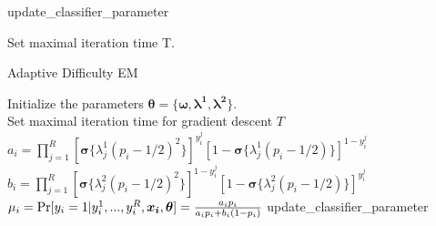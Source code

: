 \documentclass{article}
\begin{document}
\begin{algorithm}
    \caption{update\_classifier\_parameter}
    Set maximal iteration time T.\\
    
\end{algorithm}

\begin{algorithm}
    \caption{Adaptive Difficulty EM}
    Initialize the parameters $\bm{\theta}=\lbrace 
    \bm{\omega,\lambda^1,\lambda^2} \rbrace $.\\
    Set maximal iteration time for gradient descent $T$\\
    {
        {$a_i=\prod_{j=1}^R[\bm{\sigma}\{ \lambda_j^1(p_i-1/2)^2 \}]^{y_i^j} [1-\bm{\sigma}\{ \lambda_j^1 (p_i-1/2) \}]^{1-y_i^j} $ \\
        $b_i=\prod_{j=1}^R[\bm{\sigma}\{ \lambda_j^2(p_i-1/2)^2 \}]^{1-y_i^j} [1-\bm{\sigma}\{ \lambda_j^2 (p_i-1/2) \}]^{y_i^j} $ \\
        $\mu_i=\textup{Pr}[y_i=1|y_i^1,...,y_i^R,\bm{x_i},\bm{\theta} ]=\frac{a_i p_i}{a_i p_i + b_i(1-p_i)} $
        }
    update\_classifier\_parameter \\
    }
    
\end{algorithm}
\end{document}
